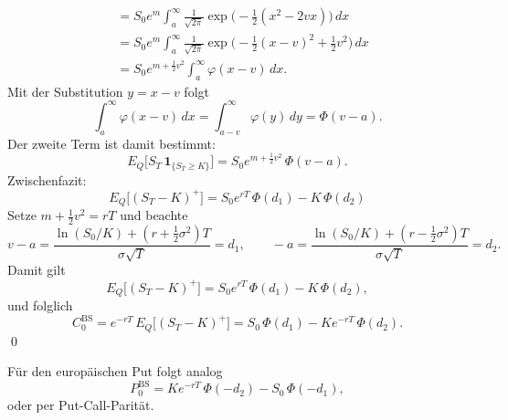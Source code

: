 \begin{satz}
$$\begin{aligned}
&= S_0 e^{m}\int_a^\infty \frac{1}{\sqrt{2\pi}}
\exp\!\Big(-\tfrac12(x^2 - 2 v x)\Big)\,dx \\
&= S_0 e^{m}\int_a^\infty \frac{1}{\sqrt{2\pi}}
\exp\!\Big(-\tfrac12(x - v)^2 + \tfrac12 v^2\Big)\,dx \\
&= S_0 e^{m + \frac12 v^2}\int_a^\infty \varphi(x - v)\,dx.
\end{aligned}
$$
Mit der Substitution $y=x-v$ folgt
$$
\int_a^\infty \varphi(x - v)\,dx = \int_{a-v}^\infty \varphi(y)\,dy = \Phi(v-a).
$$
Der zweite Term ist damit bestimmt:
$$
E_Q\big[S_T\,\mathbf 1_{\{S_T\ge K\}}\big]
= S_0 e^{m + \frac12 v^2}\,\Phi(v-a).
$$
Zwischenfazit:
$$
E_Q\big[(S_T - K)^+\big] = S_0 e^{rT}\,\Phi(d_1) - K\,\Phi(d_2)
$$
Setze $m+\tfrac12 v^2 = rT$ und beachte
$$
v-a = \frac{\ln(S_0/K) + (r+\tfrac12\sigma^2)T}{\sigma \sqrt{T}} = d_1,
\qquad
-a = \frac{\ln(S_0/K) + (r-\tfrac12\sigma^2)T}{\sigma \sqrt{T}} = d_2.
$$
Damit gilt
$$
E_Q\big[(S_T - K)^+\big]
= S_0 e^{rT}\,\Phi(d_1) - K\,\Phi(d_2),
$$
und folglich
$$
C_0^{\mathrm{BS}} = e^{-rT}\,E_Q\big[(S_T - K)^+\big]
= S_0\,\Phi(d_1) - K e^{-rT}\,\Phi(d_2).
$$
\qed
\end{satz}

\begin{bem}
Für den europäischen Put folgt analog
$$
P_0^{\mathrm{BS}} = K e^{-rT}\,\Phi(-d_2) - S_0\,\Phi(-d_1),
$$
oder per Put-Call-Parität.

\end{bem}

